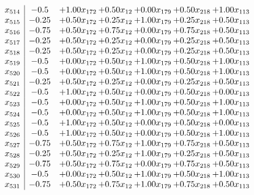 \documentclass[8pt]{article}
\begin{document}
\[\begin{array}{c| c c@{\hskip 2pt} c@{\hskip 2pt} c@{\hskip 2pt} c@{\hskip 2pt} c@{\hskip 2pt} }
 x_{514}   &  -0.5 & +  1.00 x_{172} & +  0.50 x_{12} & +  0.00 x_{179} & +  0.50 x_{218} & +  1.00 x_{113}\\
 x_{515}   &  -0.25 & +  0.50 x_{172} & +  0.25 x_{12} & +  1.00 x_{179} & +  0.25 x_{218} & +  0.50 x_{113}\\
 x_{516}   &  -0.75 & +  0.50 x_{172} & +  0.75 x_{12} & +  0.00 x_{179} & +  0.75 x_{218} & +  0.50 x_{113}\\
 x_{517}   &  -0.25 & +  0.50 x_{172} & +  0.25 x_{12} & +  0.00 x_{179} & +  0.25 x_{218} & +  0.50 x_{113}\\
 x_{518}   &  -0.25 & +  0.50 x_{172} & +  0.25 x_{12} & +  0.00 x_{179} & +  0.25 x_{218} & +  0.50 x_{113}\\
 x_{519}   &  -0.5 & +  0.00 x_{172} & +  0.50 x_{12} & +  1.00 x_{179} & +  0.50 x_{218} & +  1.00 x_{113}\\
 x_{520}   &  -0.5 & +  0.00 x_{172} & +  0.50 x_{12} & +  1.00 x_{179} & +  0.50 x_{218} & +  1.00 x_{113}\\
 x_{521}   &  -0.25 & +  0.50 x_{172} & +  0.25 x_{12} & +  0.00 x_{179} & +  0.25 x_{218} & +  0.50 x_{113}\\
 x_{522}   &  -0.5 & +  1.00 x_{172} & +  0.50 x_{12} & +  0.00 x_{179} & +  0.50 x_{218} & +  0.00 x_{113}\\
 x_{523}   &  -0.5 & +  0.00 x_{172} & +  0.50 x_{12} & +  1.00 x_{179} & +  0.50 x_{218} & +  1.00 x_{113}\\
 x_{524}   &  -0.5 & +  0.00 x_{172} & +  0.50 x_{12} & +  1.00 x_{179} & +  0.50 x_{218} & +  1.00 x_{113}\\
 x_{525}   &  -0.5 & +  1.00 x_{172} & +  0.50 x_{12} & +  0.00 x_{179} & +  0.50 x_{218} & +  0.00 x_{113}\\
 x_{526}   &  -0.5 & +  1.00 x_{172} & +  0.50 x_{12} & +  0.00 x_{179} & +  0.50 x_{218} & +  1.00 x_{113}\\
 x_{527}   &  -0.75 & +  0.50 x_{172} & +  0.75 x_{12} & +  1.00 x_{179} & +  0.75 x_{218} & +  0.50 x_{113}\\
 x_{528}   &  -0.25 & +  0.50 x_{172} & +  0.25 x_{12} & +  1.00 x_{179} & +  0.25 x_{218} & +  0.50 x_{113}\\
 x_{529}   &  -0.75 & +  0.50 x_{172} & +  0.75 x_{12} & +  0.00 x_{179} & +  0.75 x_{218} & +  0.50 x_{113}\\
 x_{530}   &  -0.5 & +  0.00 x_{172} & +  0.50 x_{12} & +  1.00 x_{179} & +  0.50 x_{218} & +  1.00 x_{113}\\
 x_{531}   &  -0.75 & +  0.50 x_{172} & +  0.75 x_{12} & +  1.00 x_{179} & +  0.75 x_{218} & +  0.50 x_{113}\\

\end{array}\]
\end{document}
